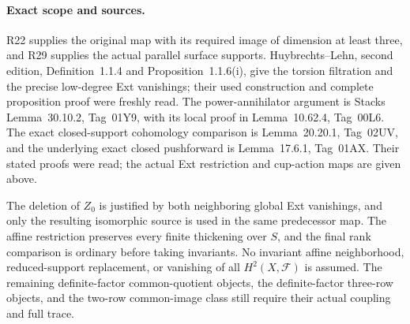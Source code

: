 \paragraph{Exact scope and sources.}
R22 supplies the original map with
its required image of dimension at
least three, and R29 supplies the
actual parallel surface supports.
Huybrechts--Lehn, second edition,
Definition~1.1.4 and Proposition~1.1.6(i),
give the torsion filtration and the
precise low-degree Ext vanishings;
their used construction and complete
proposition proof were freshly read.
The power-annihilator argument is
Stacks Lemma~30.10.2, Tag~01Y9, with
its local proof in Lemma~10.62.4,
Tag~00L6. The exact closed-support
cohomology comparison is Lemma~20.20.1,
Tag~02UV, and the underlying exact
closed pushforward is Lemma~17.6.1,
Tag~01AX. Their stated proofs were
read; the actual Ext restriction and
cup-action maps are given above.

The deletion of $Z_0$ is justified
by both neighboring global Ext
vanishings, and only the resulting
isomorphic source is used in the
same predecessor map. The affine
restriction preserves every finite
thickening over $S$, and the final
rank comparison is ordinary before
taking invariants. No invariant
affine neighborhood, reduced-support
replacement, or vanishing of all
$H^2(X,\mathcal F)$ is assumed.
The remaining definite-factor
common-quotient objects, the
definite-factor three-row objects,
and the two-row common-image class
still require their actual coupling
and full trace.

